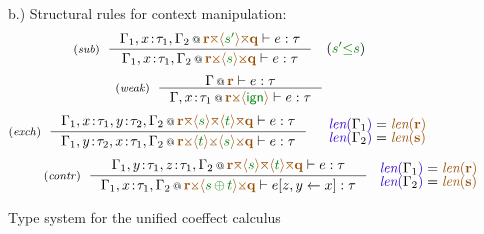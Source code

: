 \begin{figure}[t]
\vspace{1.5em}
{\small b.) Structural rules for context manipulation:}
\begin{equation*}
\tyrule{sub}
  {\coctx{\Gamma_1,x\!:\!\tau_1,\Gamma_2}{\aclrd{\textbf{r}} \azip \alift{\cclrd{s'}} \azip \aclrd{\textbf{q}}} \vdash e : \tau}
  {\coctx{\Gamma_1,x\!:\!\tau_1,\Gamma_2}{\aclrd{\textbf{r}} \apar \alift{\cclrd{s}} \apar \aclrd{\textbf{q}}} \vdash e : \tau}
\quad
(\cclrd{s'} \cleq \cclrd{s})
\end{equation*}
\begin{equation*}
\tyrule{weak}
  {\coctx{\Gamma}{ \aclrd{\textbf{r}} } \vdash e : \tau}
  {\coctx{\Gamma,x \!:\! \tau_1}{\aclrd{\textbf{r}} \apar \alift{ \czero }} \vdash e : \tau} 
\end{equation*}
\begin{equation*}
\tyrule{exch}
  {\coctx{\Gamma_1,x\!:\!\tau_1,y\!:\!\tau_2,\Gamma_2}{\aclrd{\textbf{r}} \azip \alift{\cclrd{s}} \azip \alift{\cclrd{t}} \azip \aclrd{\textbf{q}}} \vdash e : \tau}
  {\coctx{\Gamma_1,y\!:\!\tau_2,x\!:\!\tau_1,\Gamma_2}{\aclrd{\textbf{r}} \apar \alift{\cclrd{t}} \apar \alift{\cclrd{s}} \apar \aclrd{\textbf{q}}} \vdash e : \tau}
\quad
\begin{array}{l}
 \slen{\Gamma_1} = \alen{\aclrd{\textbf{r}}}\\[-0.25em]
 \slen{\Gamma_2} = \alen{\aclrd{\textbf{s}}}
\end{array}
\end{equation*}
\begin{equation*}
\hspace{2.5em} 
\tyrule{contr}
  {\coctx{\Gamma_1,y\!:\!\tau_1,z\!:\!\tau_1,\Gamma_2}{\aclrd{\textbf{r}} \azip \alift{\cclrd{s}} \azip \alift{\cclrd{t}} \azip \aclrd{\textbf{q}}} \vdash e : \tau}
  {\coctx{\Gamma_1,x\!:\!\tau_1,\Gamma_2}{\aclrd{\textbf{r}} \apar \alift{\cclrd{s} \,\cpar\, \cclrd{t}} \apar \aclrd{\textbf{q}}} \vdash \subst{e}{z,y}{x} : \tau}
~
\begin{array}{l}
 \slen{\Gamma_1} = \alen{\aclrd{\textbf{r}}}\\[-0.25em]
 \slen{\Gamma_2} = \alen{\aclrd{\textbf{s}}}
\end{array}
\end{equation*}

\vspace{0.5em}
\caption{Type system for the unified coeffect calculus}
\label{fig:unif-types}
\end{figure}


